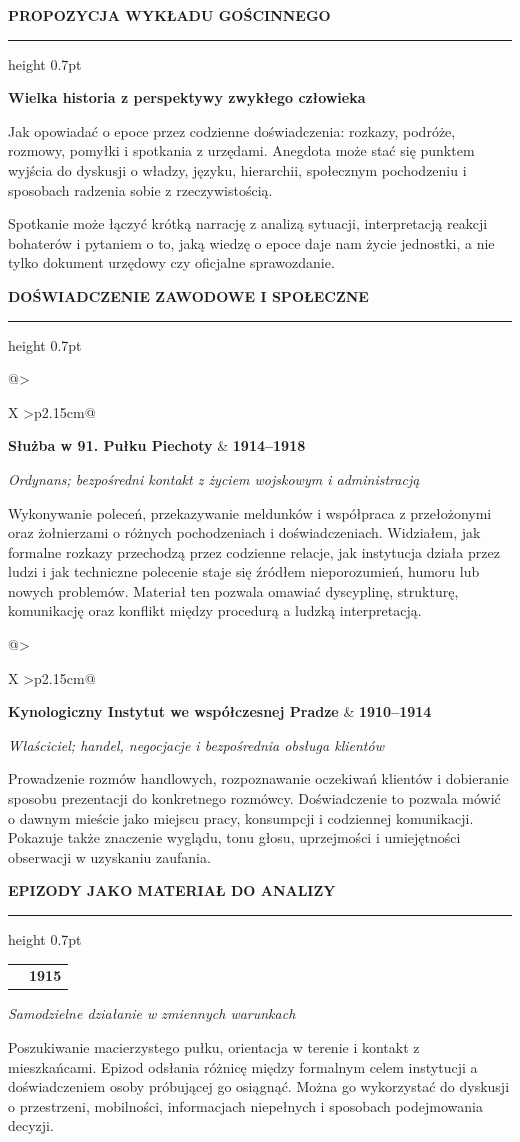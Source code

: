 \documentclass[9pt,a4paper]{article}
\makeatletter
\newcommand{\cvsection}[2]{%
  \vspace{0.40em}%
  {\color{#1}\bfseries\fontsize{9.4}{10.6}\selectfont
    \MakeUppercase{#2}\par}%
  \vspace{0.06em}%
  {\color{#1}\hrule height 0.7pt}%
  \vspace{0.14em}%
}
\newcommand{\cventry}[4]{%
  \begin{tabularx}{\linewidth}{@{}>{\raggedright\arraybackslash}X
                                  >{\raggedleft\arraybackslash}p{2.15cm}@{}}
    {\fontsize{9}{10.2}\selectfont\bfseries\color{navy}#2} &
    {\fontsize{8}{9.2}\selectfont\bfseries\color{teal}#1}
  \end{tabularx}
  {\fontsize{8.2}{9.4}\selectfont\itshape\color{burgundy}#3\par}
  \vspace{0.06em}
  {\fontsize{8.45}{9.9}\selectfont #4\par}
  \vspace{0.17em}
}
\makeatother
\begin{document}
\hfill
\begin{minipage}[t]{0.685\textwidth}
\vspace{0pt}
\fontsize{8.55}{10}\selectfont

\cvsection{navy}{Propozycja wykładu gościnnego}

{\color{navy}\bfseries\fontsize{10.2}{11.5}\selectfont
Wielka historia z perspektywy zwykłego człowieka}\par
\vspace{0.07em}

Jak opowiadać o epoce przez codzienne doświadczenia: rozkazy,
podróże, rozmowy, pomyłki i spotkania z urzędami. Anegdota może
stać się punktem wyjścia do dyskusji o władzy, języku, hierarchii,
społecznym pochodzeniu i sposobach radzenia sobie z rzeczywistością.

Spotkanie może łączyć krótką narrację z analizą sytuacji, interpretacją
reakcji bohaterów i pytaniem o to, jaką wiedzę o epoce daje nam życie
jednostki, a nie tylko dokument urzędowy czy oficjalne sprawozdanie.

\cvsection{burgundy}{Doświadczenie zawodowe i społeczne}

\cventry
  {1914--1918}
  {Służba w 91. Pułku Piechoty}
  {Ordynans; bezpośredni kontakt z życiem wojskowym i administracją}
  {Wykonywanie poleceń, przekazywanie meldunków i współpraca
  z przełożonymi oraz żołnierzami o różnych pochodzeniach i doświadczeniach.
  Widziałem, jak formalne rozkazy przechodzą przez codzienne relacje,
  jak instytucja działa przez ludzi i jak techniczne polecenie
  staje się źródłem nieporozumień, humoru lub nowych problemów.
  Materiał ten pozwala omawiać dyscyplinę, strukturę, komunikację
  oraz konflikt między procedurą a ludzką interpretacją.}

\cventry
  {1910--1914}
  {Kynologiczny Instytut we współczesnej Pradze}
  {Właściciel; handel, negocjacje i bezpośrednia obsługa klientów}
  {Prowadzenie rozmów handlowych, rozpoznawanie oczekiwań klientów
  i dobieranie sposobu prezentacji do konkretnego rozmówcy.
  Doświadczenie to pozwala mówić o dawnym mieście jako miejscu pracy,
  konsumpcji i codziennej komunikacji. Pokazuje także znaczenie
  wyglądu, tonu głosu, uprzejmości i umiejętności obserwacji
  w uzyskaniu zaufania.}

\cvsection{burgundy}{Epizody jako materiał do analizy}

\cventry
  {1915}
  {Marsz przez południowe Czechy}
  {Samodzielne działanie w zmiennych warunkach}
  {Poszukiwanie macierzystego pułku, orientacja w terenie i kontakt
  z mieszkańcami. Epizod odsłania różnicę między formalnym celem
  instytucji a doświadczeniem osoby próbującej go osiągnąć.
  Można go wykorzystać do dyskusji o przestrzeni, mobilności,
  informacjach niepełnych i sposobach podejmowania decyzji.}


\end{minipage}
\end{document}
